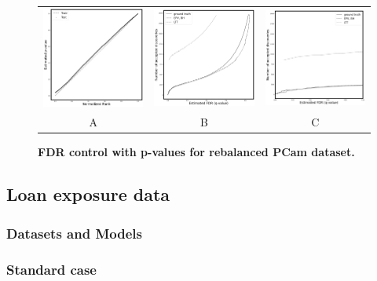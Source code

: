 \documentclass{article}
\begin{document}
\begin{figure}
	\centering
	\begin{tabular}{ccc}
 		\includegraphics[width=2in]{img/pcam_balanced_QQ.png} &
		\includegraphics[width=2in]{img/pcam_balanced_fdr_control.png} & 
            \includegraphics[width=2in]{img/pcam_balanced_fdr_control_loc.png}
		\\	
		A & B & C
	\end{tabular}
	\caption{\bf FDR control with p-values for rebalanced PCam dataset.}
	\label{fig:pcam}
\end{figure} 

\subsection{Loan exposure data}

\subsubsection{Datasets and Models}

\subsubsection{Standard case}
\end{document}
